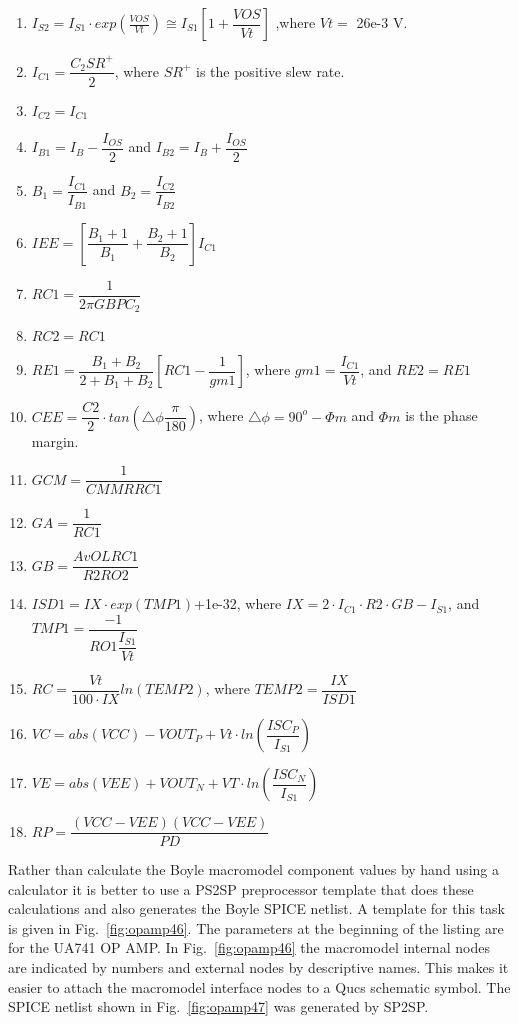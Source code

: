 \begin{enumerate}
 \item $I_{S2} = I_{S1} \cdot exp\left(\frac{VOS}{Vt}\right)   \cong I_{S1}\left[ 1+\dfrac{VOS}{Vt}\right]$ ,where $Vt = $ 26e-3 V.
 \item $I_{C1} = \dfrac{C_{2} SR^{+}}{2}$, where $SR^{+}$ is the positive slew rate.
 \item $I_{C2} = I_{C1}$
 \item $I_{B1} = I_{B}-\dfrac{I_{OS}}{2}$ and $I_{B2} = I_{B} + \dfrac{I_{OS}}{2}$
 \item $B_{1} = \dfrac{I_{C1}}{I_{B1}}$ and $B_{2} = \dfrac{I_{C2}}{I_{B2}}$ 
 \item $IEE = \left[ \dfrac{B_{1}+1}{B_{1}} + \dfrac{B_{2}+1}{B_{2}}\right] I_{C1}$
 \item $RC1 = \dfrac{1}{2 \pi GBP C_{2}}$ 
 \item $RC2 = RC1$
 \item $RE1 = \dfrac{B_{1}+B_{2}}{2+B_{1}+B_{2}}\left[ RC1-\dfrac{1}{gm1}\right] $, where $gm1 = \dfrac{I_{C1}}{Vt}$, and $RE2 = RE1$
 \item $CEE = \dfrac{C2}{2} \cdot tan\left(  \triangle \phi \dfrac{\pi}{180}\right)$, where $\triangle \phi = 90^{o} - \Phi m$ and $\Phi m$ is the phase margin.
 \item $GCM = \dfrac{1}{CMMR RC1}$
 \item $GA = \dfrac{1}{RC1}$
 \item $GB = \dfrac{AvOL RC1}{R2 RO2}$
 \item $ISD1 = IX \cdot exp\left(TMP1\right) $+1e-32, where $IX = 2 \cdot I_{C1} \cdot R2 \cdot GB -I_{S1}$, \linebreak and $TMP1 = \dfrac{-1}{RO1\dfrac{I_{S1}}{Vt}}$
 \item $RC = \dfrac{Vt}{100 \cdot IX}ln\left( TEMP2\right) $, where $TEMP2 = \dfrac{IX}{ISD1}$
 \item $VC = abs\left( VCC\right) - VOUT_P + Vt \cdot ln\left( \dfrac{ISC_P}{I_{S1}}\right) $
 \item $VE = abs\left( VEE\right) + VOUT_N + VT \cdot ln\left( \dfrac{ISC_N}{I_{S1}}\right) $ 
 \item $RP = \dfrac{\left( VCC-VEE\right) \left( VCC-VEE\right) }{PD}$
\end{enumerate}

Rather than calculate the Boyle macromodel component values by hand using a calculator it is better to use a PS2SP preprocessor template that does these calculations and also generates the Boyle SPICE netlist. A template for this task is given in Fig.~\ref{fig:opamp46}.  The parameters at the beginning of the listing are for the UA741 OP AMP. In Fig.~\ref{fig:opamp46} the macromodel internal nodes are indicated by numbers and external nodes by descriptive names. This makes it easier to attach the macromodel interface nodes to a Qucs schematic symbol.  The SPICE netlist shown in Fig.~\ref{fig:opamp47} was generated by SP2SP.

